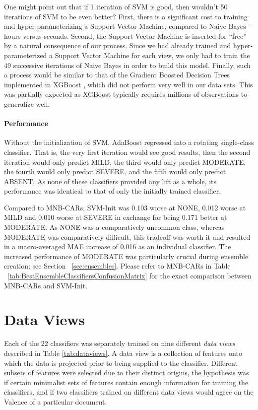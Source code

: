 One might point out that if 1 iteration of SVM is good, then wouldn't 50 iterations of SVM to be even better? First, there is a significant cost to training and hyper-parameterizing a Support Vector Machine, compared to Naive Bayes -- hours versus seconds. Second, the Support Vector Machine is inserted for ``free'' by a natural consequence of our process. Since we had already trained and hyper-parameterized a Support Vector Machine for each view, we only had to train the 49 successive iterations of Naive Bayes in order to build this model. Finally, such a process would be similar to that of the Gradient Boosted Decision Trees implemented in XGBoost \cite{xgboost}, which did not perform very well in our data sets. This was partially expected as XGBoost typically requires millions of observations to generalize well.

\paragraph{Performance} Without the initialization of SVM, AdaBoost regressed into a rotating single-class classifier. That is, the very first iteration would see good results, then the second iteration would only predict \textsf{MILD}, the third would only predict \textsf{MODERATE}, the fourth would only predict \textsf{SEVERE}, and the fifth would only predict \textsf{ABSENT}. As none of these classifiers provided any lift as a whole, its performance was identical to that of only the initially trained classifier.

Compared to \textsf{MNB-CARs}, \textsf{SVM-Init} was 0.103 worse at \textsf{NONE}, 0.012 worse at \textsf{MILD} and 0.010 worse at \textsf{SEVERE} in exchange for being 0.171 better at \textsf{MODERATE}. As \textsf{NONE} was a comparatively uncommon class, whereas \textsf{MODERATE} was comparatively difficult, this tradeoff was worth it and resulted in a macro-averaged MAE increase of 0.016 as an individual classifier. The increased performance of \textsf{MODERATE} was particularly crucial during ensemble creation; see Section ~\ref{sec:ensembles}. Please refer to \textsf{MNB-CARs} in Table ~\ref{tab:BestEnsembleClassifiersConfusionMatrix} for the exact comparison between \textsf{MNB-CARs} and \textsf{SVM-Init}. 

\section{Data Views}

Each of the 22 classifiers 
was separately trained on nine different \textit{data views} described
in Table \ref{tab:dataviews}.  A data view is a collection of features
onto which the data is projected prior to being supplied to the classifier.
Different subsets of features were selected due to their distinct origins,
the hypothesis was if certain minimalist sets of
features contain enough information for training the classifiers, and if two classifiers trained on different data views would agree on the \textsf{Valence} of a particular document.

